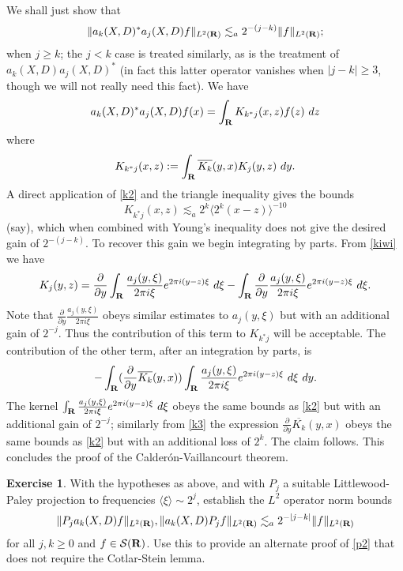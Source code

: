 \documentclass[11pt]{article}
\theoremstyle{definition}
\newtheorem{exercise}[theorem]{Exercise}
\begin{document}
 We shall just show that 
\[\displaystyle  \| a_k(X,D)^* a_j(X,D) f\|_{L^2({\bf R})} \lesssim_{a} 2^{-(j-k)} \|f\|_{L^2({\bf R})};\]
 when \({j \geq k}\); the \({j < k}\) case is treated similarly, as is the treatment of \({a_k(X,D) a_j(X,D)^*}\) (in fact this latter operator vanishes when \({|j-k| \geq 3}\), though we will not really need this fact). We have 
\[\displaystyle a_k(X,D)^* a_j(X,D) f(x) = \int_{\bf R} K_{k^*j}(x,z) f(z)\ dz\]
 where 
\[\displaystyle  K_{k^*j}(x,z) := \int_{\bf R} \overline{K_k}(y,x) K_j(y,z)\ dy.\]
 A direct application of \eqref{k2} and the triangle inequality gives the bounds 
\[\displaystyle K_{k^*j}(x,z) \lesssim_{a} 2^k \langle 2^k(x-z) \rangle^{-10}\]
 (say), which when combined with Young’s inequality does not give the desired gain of \({2^{-(j-k)}}\). To recover this gain we begin integrating by parts. From \eqref{kiwi} we have 
\[\displaystyle  K_j(y,z) =\frac{\partial}{\partial y} \int_{\bf R} \frac{a_j(y,\xi)}{2\pi i \xi} e^{2\pi i (y-z) \xi}\ d\xi - \int_{\bf R} \frac{\partial}{\partial y} \frac{a_j(y,\xi)}{2\pi i \xi} e^{2\pi i (y-z) \xi}\ d\xi.\]
 Note that \({\frac{\partial}{\partial y} \frac{a_j(y,\xi)}{2\pi i \xi}}\) obeys similar estimates to \({a_j(y,\xi)}\) but with an additional gain of \({2^{-j}}\). Thus the contribution of this term to \({K_{k^*j}}\) will be acceptable. The contribution of the other term, after an integration by parts, is 
\[\displaystyle  -\int_{\bf R} (\frac{\partial}{\partial y} \overline{K_k}(y,x)) \int_{\bf R} \frac{a_j(y,\xi)}{2\pi i \xi} e^{2\pi i (y-z) \xi}\ d\xi\ dy.\]
 The kernel \({\int_{\bf R} \frac{a_j(y,\xi)}{2\pi i \xi} e^{2\pi i (y-z) \xi}\ d\xi}\) obeys the same bounds as \eqref{k2} but with an additional gain of \({2^{-j}}\); similarly from \eqref{k3} the expression \({\frac{\partial}{\partial y} \overline{K_k}(y,x)}\) obeys the same bounds as \eqref{k2} but with an additional loss of \({2^k}\). The claim follows. This concludes the proof of the Calderón-Vaillancourt theorem.
\begin{exercise}
 \label{lp-a} With the hypotheses as above, and with \({P_j}\) a suitable Littlewood-Paley projection to frequencies \({\langle \xi \rangle \sim 2^j}\), establish the \({L^2}\) operator norm bounds 
\[\displaystyle  \| P_j a_k(X,D) f \|_{L^2({\bf R})}, \| a_k(X,D) P_j f \|_{L^2({\bf R})} \lesssim_a 2^{-|j-k|} \|f\|_{L^2({\bf R})}\]
 for all \({j,k \geq 0}\) and \({f \in {\mathcal S}({\bf R})}\). Use this to provide an alternate proof of \eqref{p2} that does not require the Cotlar-Stein lemma. 
\end{exercise}
\end{document}
